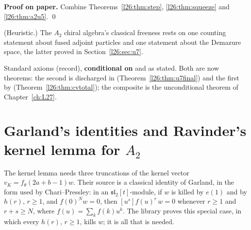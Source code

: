 \textbf{Proof on paper.} Combine Theorems~\ref{l26:thm:step}, \ref{l26:thm:squeeze} and \ref{l26:thm:a2u5}. \qed

\begin{physics}
(Heuristic.) The $A_2$ chiral algebra's classical freeness rests on one counting statement about fused adjoint particles and
one statement about the Demazure space, the latter proved in Section~\ref{l26:sec:u7}.
\end{physics}

\begin{status}
Standard axioms (record), \textbf{conditional on}  and  as stated.
Both are now theorems: the second is discharged in  (Theorem~\ref{l26:thm:u7final}) and the
first by  (Theorem~\ref{l26:thm:cvtotal}); the composite is the unconditional theorem of
Chapter~\ref{ch:L27}.
\end{status}

\section{Garland's identities and Ravinder's kernel lemma for $A_2$}\label{l26:sec:garland}

The kernel lemma needs three truncations of the kernel vector $v_K=f_\theta(2a+b-1)w$. Their source is a classical
identity of Garland, in the form used by Chari--Pressley: in an $\mathfrak{sl}_2[t]$-module, if $w$ is killed by $e(1)$
and by $h(r)$, $r\ge1$, and $f(0)^Nw=0$, then $[u^s]f(u)^r\,w=0$ whenever $r\ge1$ and $r+s\ge N$, where
$f(u)=\sum_kf(k)u^k$. The library proves this special case, in which every $h(r)$, $r\ge1$, kills $w$; it is all that is
needed.

